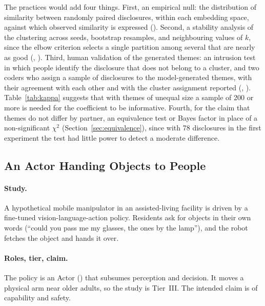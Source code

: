 The practices would add four things. First, an empirical null: the
distribution of similarity between randomly paired disclosures, within each
embedding space, against which observed similarity is expressed ().
Second, a stability analysis of the clustering across seeds, bootstrap
resamples, and neighbouring values of $k$, since the elbow criterion selects
a single partition among several that are nearly as good (, ).
Third, human validation of the generated themes: an intrusion test in which
people identify the disclosure that does not belong to a cluster, and two
coders who assign a sample of disclosures to the model-generated themes, with
their agreement with each other and with the cluster assignment reported
(, ). Table~\ref{tab:kappa} suggests that with themes of unequal
size a sample of 200 or more is needed for the coefficient to be informative.
Fourth, for the claim that themes do not differ by partner, an equivalence
test or Bayes factor in place of a non-significant $\chi^2$
(Section~\ref{sec:equivalence}), since with 78 disclosures in the first
experiment the test had little power to detect a moderate difference.

\subsection{An Actor Handing Objects to People}
\label{sec:exC}

\paragraph{Study.} A hypothetical mobile manipulator in an assisted-living
facility is driven by a fine-tuned vision-language-action policy. Residents
ask for objects in their own words (``could you pass me my glasses, the ones
by the lamp''), and the robot fetches the object and hands it over.

\paragraph{Roles, tier, claim.} The policy is an Actor () that
subsumes perception and decision. It moves a physical arm near older adults,
so the study is Tier~III. The intended claim is of capability and safety.

